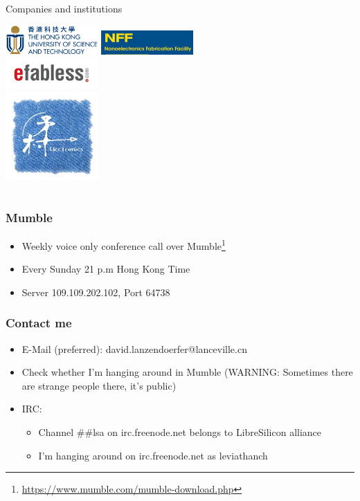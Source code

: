 \documentclass{beamer}
\begin{document}
\begin{frame}{Companies and institutions}
	\begin{center}
		\includegraphics[width=100pt]{HKUST_Logo.png}
		\includegraphics[width=100pt]{NFF.jpg}  \\
		\includegraphics[width=100pt]{efabless_logo.png} \\
		\includegraphics[width=100pt]{Lanceville.png}
	\end{center}
\end{frame}



\section[Conclusion]{}

\begin{frame}
	\frametitle{Mumble}
	\begin{itemize}
		\item Weekly voice only conference call over Mumble\footnote{\url{https://www.mumble.com/mumble-download.php}}
		\item Every Sunday 21 p.m Hong Kong Time
		\item Server 109.109.202.102, Port 64738
	\end{itemize}
\end{frame}


\begin{frame}
	\frametitle{Contact me}
	\begin{itemize}
		\item E-Mail (preferred): david.lanzendoerfer@lanceville.cn
		\item Check whether I'm hanging around in Mumble (WARNING: Sometimes there are strange people there, it's public)
		\item IRC: \begin{itemize}
			\item Channel \#\#lsa on irc.freenode.net belongs to LibreSilicon alliance
			\item I'm hanging around on irc.freenode.net as leviathanch
		\end{itemize}
	\end{itemize}
\end{frame}
\end{document}

